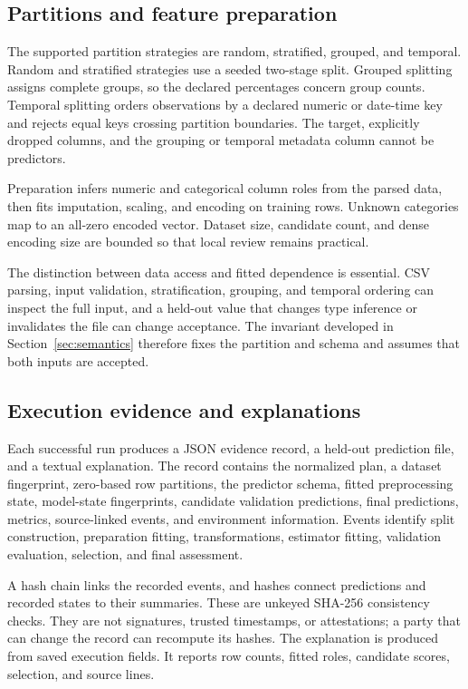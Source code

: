 \documentclass[lettersize,journal]{IEEEtran}
\begin{document}
\subsection{Partitions and feature preparation}
The supported partition strategies are random, stratified, grouped, and temporal. Random and stratified strategies use a seeded two-stage split. Grouped splitting assigns complete groups, so the declared percentages concern group counts. Temporal splitting orders observations by a declared numeric or date-time key and rejects equal keys crossing partition boundaries. The target, explicitly dropped columns, and the grouping or temporal metadata column cannot be predictors.

Preparation infers numeric and categorical column roles from the parsed data, then fits imputation, scaling, and encoding on training rows. Unknown categories map to an all-zero encoded vector. Dataset size, candidate count, and dense encoding size are bounded so that local review remains practical.

The distinction between data access and fitted dependence is essential. CSV parsing, input validation, stratification, grouping, and temporal ordering can inspect the full input, and a held-out value that changes type inference or invalidates the file can change acceptance. The invariant developed in Section~\ref{sec:semantics} therefore fixes the partition and schema and assumes that both inputs are accepted.

\subsection{Execution evidence and explanations}
Each successful run produces a JSON evidence record, a held-out prediction file, and a textual explanation. The record contains the normalized plan, a dataset fingerprint, zero-based row partitions, the predictor schema, fitted preprocessing state, model-state fingerprints, candidate validation predictions, final predictions, metrics, source-linked events, and environment information. Events identify split construction, preparation fitting, transformations, estimator fitting, validation evaluation, selection, and final assessment.

A hash chain links the recorded events, and hashes connect predictions and recorded states to their summaries. These are unkeyed SHA-256 consistency checks. They are not signatures, trusted timestamps, or attestations; a party that can change the record can recompute its hashes. The explanation is produced from saved execution fields. It reports row counts, fitted roles, candidate scores, selection, and source lines.
\end{document}

